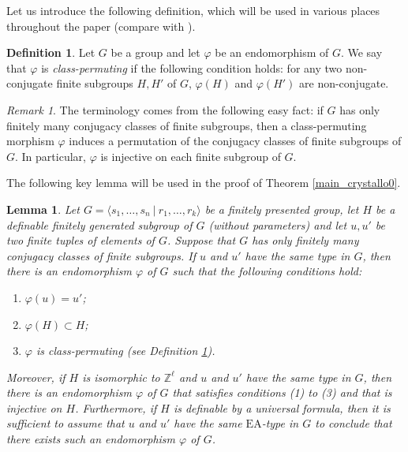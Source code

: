 \documentclass[a4paper, 11pt]{amsart}
\newtheorem{lemme}[te]{Lemma}
\theoremstyle{definition}
\newtheorem{de}[te]{Definition}
\theoremstyle{remark}
\newtheorem{rk}[te]{Remark}
\begin{document}

Let us introduce the following definition, which will be used in various places throughout the paper (compare with \cite[Definition 5.3]{And21}).

\begin{de}\label{class-permuting}Let $G$ be a group and let $\varphi$ be an endomorphism of $G$. We say that $\varphi$ is \emph{class-permuting} if the following condition holds: for any two non-conjugate finite subgroups $H,H'$ of $G$, $\varphi(H)$ and $\varphi(H')$ are non-conjugate.\end{de}

\begin{rk}
The terminology comes from the following easy fact: if $G$ has only finitely many conjugacy classes of finite subgroups, then a class-permuting morphism $\varphi$ induces a permutation of the conjugacy classes of finite subgroups of $G$. In particular, $\varphi$ is injective on each finite subgroup of $G$.
\end{rk}

The following key lemma will be used in the proof of Theorem \ref{main_crystallo0}.

\begin{lemme}\label{key_lemma_1}
Let $G=\langle s_1,\ldots,s_n\ \vert \ r_1,\ldots,r_k\rangle$ be a finitely presented group, let $H$ be a definable finitely generated subgroup of $G$ (without parameters) and let $u,u'$ be two finite tuples of elements of $G$. Suppose that $G$ has only finitely many conjugacy classes of finite subgroups. If $u$ and $u'$ have the same type in $G$, then there is an endomorphism $\varphi$ of $G$ such that the following conditions hold:
\begin{enumerate}[(1)]
    \item $\varphi(u)=u'$;
    \item $\varphi(H)\subset H$;
    \item $\varphi$ is class-permuting (see Definition \ref{class-permuting}).
\end{enumerate}
Moreover, if $H$ is isomorphic to $\mathbb{Z}^{\ell}$ and $u$ and $u'$ have the same type in $G$, then there is an endomorphism $\varphi$ of $G$ that satisfies conditions (1) to (3) and that is injective on $H$. Furthermore, if $H$ is definable by a universal formula, then it is sufficient to assume that $u$ and $u'$ have the same $\mathrm{EA}$-type in $G$ to conclude that there exists such an endomorphism $\varphi$ of $G$. 
\end{lemme}
\end{document}
